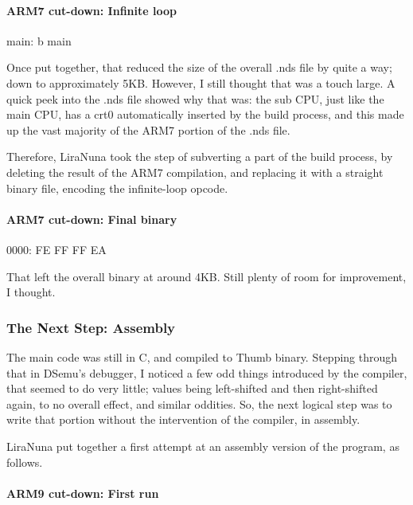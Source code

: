 \documentclass[11pt,a4paper]{article}
\let\oldparagraph\paragraph
\renewcommand{\paragraph}[1]{\oldparagraph{#1}\mbox{}}
\begin{document}
\paragraph{ARM7 cut-down: Infinite
loop}\label{arm7-cut-down-infinite-loop}

main: b main

Once put together, that reduced the size of the overall .nds file by
quite a way; down to approximately 5KB. However, I still thought that
was a touch large. A quick peek into the .nds file showed why that was:
the sub CPU, just like the main CPU, has a crt0 automatically inserted
by the build process, and this made up the vast majority of the ARM7
portion of the .nds file.

Therefore, LiraNuna took the step of subverting a part of the build
process, by deleting the result of the ARM7 compilation, and replacing
it with a straight binary file, encoding the infinite-loop opcode.

\paragraph{ARM7 cut-down: Final
binary}\label{arm7-cut-down-final-binary}

0000: FE FF FF EA

That left the overall binary at around 4KB. Still plenty of room for
improvement, I thought.

\subsubsection{The Next Step: Assembly}\label{the-next-step-assembly}

The main code was still in C, and compiled to Thumb binary. Stepping
through that in DSemu's debugger, I noticed a few odd things introduced
by the compiler, that seemed to do very little; values being
left-shifted and then right-shifted again, to no overall effect, and
similar oddities. So, the next logical step was to write that portion
without the intervention of the compiler, in assembly.

LiraNuna put together a first attempt at an assembly version of the
program, as follows.

\newpage

\paragraph{ARM9 cut-down: First run}\label{arm9-cut-down-first-run}
\end{document}
